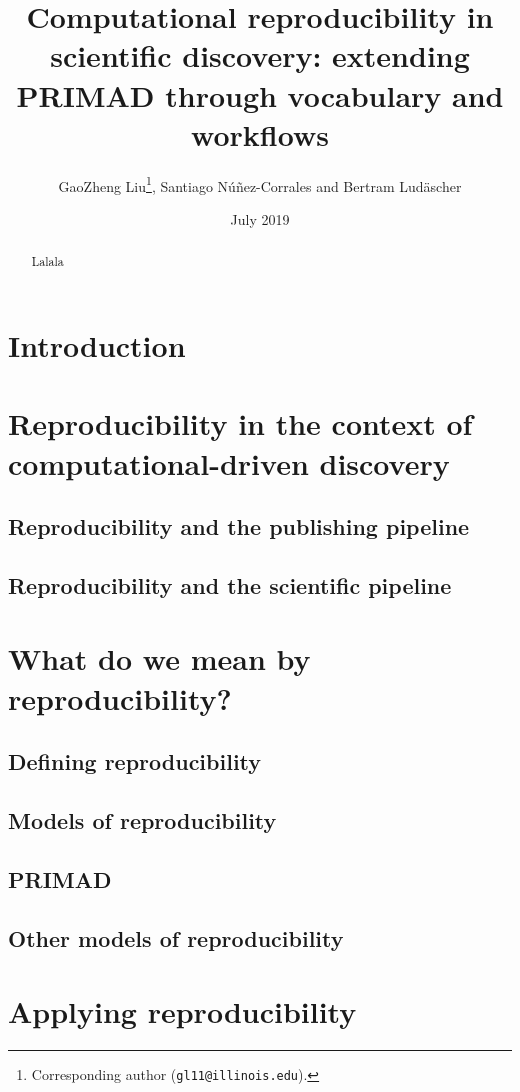 \documentclass{article}
\title{Computational reproducibility in scientific discovery: extending PRIMAD through vocabulary and workflows}
\author{GaoZheng Liu\footnote{Corresponding author (\texttt{gl11@illinois.edu}).}, Santiago N\'u\~nez-Corrales and Bertram Lud\"ascher}
\date{July 2019}
\begin{document}
\maketitle
\begin{abstract}
    Lalala
\end{abstract}

\section{Introduction}

\section{Reproducibility in the context of computational-driven discovery}

\subsection{Reproducibility and the publishing pipeline}

\subsection{Reproducibility and the scientific pipeline}

\section{What do we mean by reproducibility?}

\subsection{Defining reproducibility}

\subsection{Models of reproducibility}

\subsection{PRIMAD}

\subsection{Other models of reproducibility}

\section{Applying reproducibility}
\end{document}
